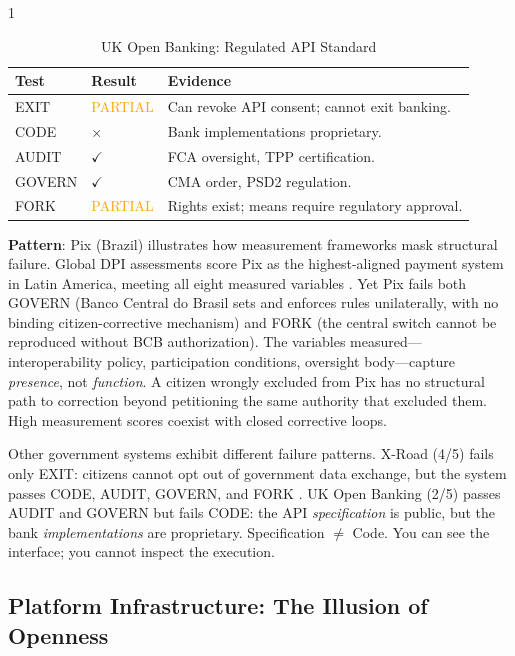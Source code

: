 \documentclass{article}
\begin{document}
\begin{table}[p]
    \begin{subtable}{1\textwidth}
        \centering
        \caption{UK Open Banking: Regulated API Standard}
        \begin{tabular}{@{}llp{7cm}@{}}
            \toprule
            \textbf{Test} & \textbf{Result} & \textbf{Evidence} \\
            \midrule
            EXIT & \textcolor{orange}{PARTIAL} & Can revoke API consent; cannot exit banking. \\
            CODE & $\times$ & Bank implementations proprietary. \\
            AUDIT & $\checkmark$ & FCA oversight, TPP certification. \\
            GOVERN & $\checkmark$ & CMA order, PSD2 regulation. \\
            FORK & \textcolor{orange}{PARTIAL} & Rights exist; means require regulatory approval. \\
            \bottomrule
        \end{tabular}
    \end{subtable}
\end{table}

\textbf{Pattern}: Pix (Brazil) illustrates how measurement frameworks mask structural failure. Global DPI assessments score Pix as the highest-aligned payment system in Latin America, meeting all eight measured variables \citep{ucl2025}. Yet Pix fails both GOVERN (Banco Central do Brasil sets and enforces rules unilaterally, with no binding citizen-corrective mechanism) and FORK (the central switch cannot be reproduced without BCB authorization). The variables measured---interoperability policy, participation conditions, oversight body---capture \textit{presence}, not \textit{function}. A citizen wrongly excluded from Pix has no structural path to correction beyond petitioning the same authority that excluded them. High measurement scores coexist with closed corrective loops.

Other government systems exhibit different failure patterns. X-Road (4/5) fails only EXIT: citizens cannot opt out of government data exchange, but the system passes CODE, AUDIT, GOVERN, and FORK \citep{xroad2026}. UK Open Banking (2/5) passes AUDIT and GOVERN but fails CODE: the API \textit{specification} is public, but the bank \textit{implementations} are proprietary. Specification $\neq$ Code. You can see the interface; you cannot inspect the execution.

\subsection{Platform Infrastructure: The Illusion of Openness}
\end{document}
